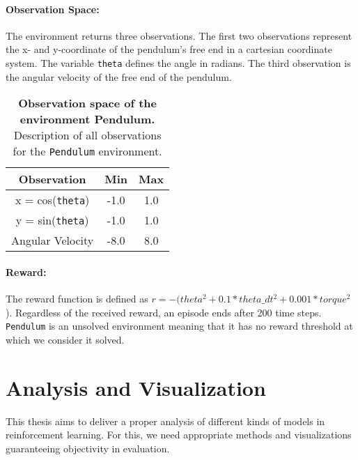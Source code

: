 \paragraph*{Observation Space:} The environment returns three observations. The first two observations represent the x- and y-coordinate of the pendulum's free end in a cartesian coordinate system. The variable \verb|theta| defines the angle in radians. The third observation is the angular velocity of the free end of the pendulum.

\begin{table}[!ht]
  \centering
  \begin{tabular}{ |c|c|c| }
    \hline
    Observation & Min & Max \\
    \hline
    x = cos(\verb|theta|) & -1.0 & 1.0 \\
    y = sin(\verb|theta|) & -1.0 & 1.0 \\
    Angular Velocity & -8.0 & 8.0 \\
    \hline
  \end{tabular}
  \caption[Observation space of the environment Pendulum]{
    \textbf{Observation space of the environment Pendulum.}
    Description of all observations for the \texttt{Pendulum} environment.
  }
  \label{table:pendulum_obs}
\end{table}

\paragraph*{Reward:} The reward function is defined as $r = -(theta^2 + 0.1 * theta\_dt^2 + 0.001 * torque^2$). Regardless of the received reward, an episode ends after 200 time steps. \verb|Pendulum| is an unsolved environment meaning that it has no reward threshold at which we consider it solved.


\section{Analysis and Visualization}
\label{sec:benchmarks}
This thesis aims to deliver a proper analysis of different kinds of models in reinforcement learning. For this, we need appropriate methods and visualizations guaranteeing objectivity in evaluation.
